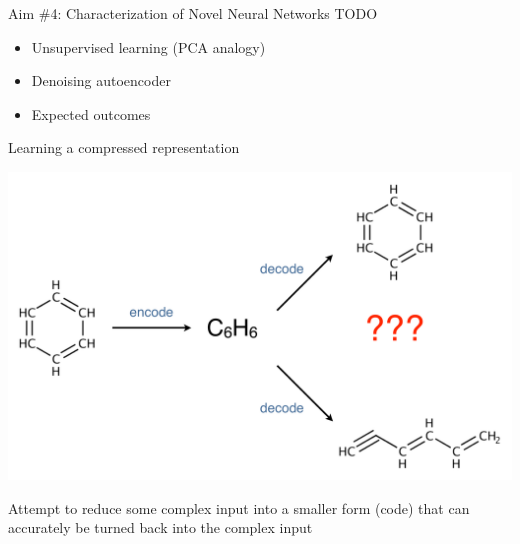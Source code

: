\documentclass[xetex,compress]{beamer}
\begin{document}
\begin{frame}{Aim \#4: Characterization of Novel Neural Networks}
  TODO
  \begin{itemize}
  \item Unsupervised learning (PCA analogy)
  \item Denoising autoencoder
  \item Expected outcomes
  \end{itemize}
\end{frame}

\begin{frame}{Learning a compressed representation}
  \begin{center}
    \includegraphics[width=1.00\textwidth]{./figures/autoencoder_example.pdf}
  \end{center}
  Attempt to reduce some complex input into a smaller form (code) that can accurately be turned back into the complex input
\end{frame}
\end{document}
